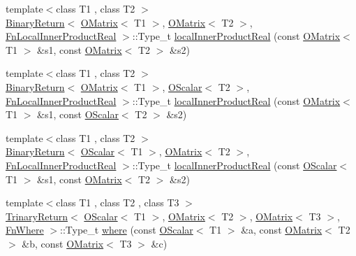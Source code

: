 \begin{DoxyCompactItemize}
\item 
{\footnotesize template$<$class T1 , class T2 $>$ }\\\mbox{\hyperlink{structENSEM_1_1BinaryReturn}{Binary\+Return}}$<$ \mbox{\hyperlink{classENSEM_1_1OMatrix}{O\+Matrix}}$<$ T1 $>$, \mbox{\hyperlink{classENSEM_1_1OMatrix}{O\+Matrix}}$<$ T2 $>$, \mbox{\hyperlink{structENSEM_1_1FnLocalInnerProductReal}{Fn\+Local\+Inner\+Product\+Real}} $>$\+::Type\+\_\+t \mbox{\hyperlink{group__obsmatrix_gacc55b39949beec3cc3690b3c892801d2}{local\+Inner\+Product\+Real}} (const \mbox{\hyperlink{classENSEM_1_1OMatrix}{O\+Matrix}}$<$ T1 $>$ \&s1, const \mbox{\hyperlink{classENSEM_1_1OMatrix}{O\+Matrix}}$<$ T2 $>$ \&s2)
\item 
{\footnotesize template$<$class T1 , class T2 $>$ }\\\mbox{\hyperlink{structENSEM_1_1BinaryReturn}{Binary\+Return}}$<$ \mbox{\hyperlink{classENSEM_1_1OMatrix}{O\+Matrix}}$<$ T1 $>$, \mbox{\hyperlink{classENSEM_1_1OScalar}{O\+Scalar}}$<$ T2 $>$, \mbox{\hyperlink{structENSEM_1_1FnLocalInnerProductReal}{Fn\+Local\+Inner\+Product\+Real}} $>$\+::Type\+\_\+t \mbox{\hyperlink{group__obsmatrix_ga3b363fa48471a9d3fc6da5cbfcb21fb5}{local\+Inner\+Product\+Real}} (const \mbox{\hyperlink{classENSEM_1_1OMatrix}{O\+Matrix}}$<$ T1 $>$ \&s1, const \mbox{\hyperlink{classENSEM_1_1OScalar}{O\+Scalar}}$<$ T2 $>$ \&s2)
\item 
{\footnotesize template$<$class T1 , class T2 $>$ }\\\mbox{\hyperlink{structENSEM_1_1BinaryReturn}{Binary\+Return}}$<$ \mbox{\hyperlink{classENSEM_1_1OScalar}{O\+Scalar}}$<$ T1 $>$, \mbox{\hyperlink{classENSEM_1_1OMatrix}{O\+Matrix}}$<$ T2 $>$, \mbox{\hyperlink{structENSEM_1_1FnLocalInnerProductReal}{Fn\+Local\+Inner\+Product\+Real}} $>$\+::Type\+\_\+t \mbox{\hyperlink{group__obsmatrix_gad83f3516610f8446eb55b7e511c807be}{local\+Inner\+Product\+Real}} (const \mbox{\hyperlink{classENSEM_1_1OScalar}{O\+Scalar}}$<$ T1 $>$ \&s1, const \mbox{\hyperlink{classENSEM_1_1OMatrix}{O\+Matrix}}$<$ T2 $>$ \&s2)
\item 
{\footnotesize template$<$class T1 , class T2 , class T3 $>$ }\\\mbox{\hyperlink{structENSEM_1_1TrinaryReturn}{Trinary\+Return}}$<$ \mbox{\hyperlink{classENSEM_1_1OScalar}{O\+Scalar}}$<$ T1 $>$, \mbox{\hyperlink{classENSEM_1_1OMatrix}{O\+Matrix}}$<$ T2 $>$, \mbox{\hyperlink{classENSEM_1_1OMatrix}{O\+Matrix}}$<$ T3 $>$, \mbox{\hyperlink{structENSEM_1_1FnWhere}{Fn\+Where}} $>$\+::Type\+\_\+t \mbox{\hyperlink{group__obsmatrix_ga9938a7a656eaaa3617a11303334942ef}{where}} (const \mbox{\hyperlink{classENSEM_1_1OScalar}{O\+Scalar}}$<$ T1 $>$ \&a, const \mbox{\hyperlink{classENSEM_1_1OMatrix}{O\+Matrix}}$<$ T2 $>$ \&b, const \mbox{\hyperlink{classENSEM_1_1OMatrix}{O\+Matrix}}$<$ T3 $>$ \&c)

\end{DoxyCompactItemize}
